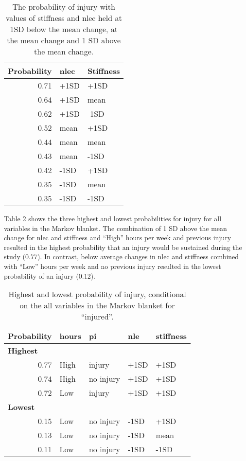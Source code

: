 \documentclass[
  english,
  man]{apa6}
\begin{document}
\begin{table}[H]

\caption{\label{tab:table11}The probability of injury with values of stiffness and nlec held at 1SD below the mean change, at the mean change and 1 SD above the mean change.}
\centering
\begin{tabular}[t]{r|l|l}
\hline
\textbf{Probability} & \textbf{nlec} & \textbf{Stiffness}\\
\hline
0.71 & +1SD & +1SD\\
\hline
0.64 & +1SD & mean\\
\hline
0.62 & +1SD & -1SD\\
\hline
0.52 & mean & +1SD\\
\hline
0.44 & mean & mean\\
\hline
0.43 & mean & -1SD\\
\hline
0.42 & -1SD & +1SD\\
\hline
0.35 & -1SD & mean\\
\hline
0.35 & -1SD & -1SD\\
\hline
\end{tabular}
\end{table}

Table \ref{tab:table12} shows the three highest and lowest probabilities for injury for all variables in the Markov blanket.
The combination of 1 SD above the mean change for nlec and stiffness and ``High'' hours per week and previous injury resulted in the highest probability that an injury would be sustained during the study (0.77).
In contrast, below average changes in nlec and stiffness combined with ``Low'' hours per week and no previous injury resulted in the lowest probability of an injury (0.12).

\begin{table}[H]

\caption{\label{tab:table12}Highest and lowest probability of injury, conditional on the all variables in the Markov blanket for ``injured''.}
\centering
\begin{tabular}[t]{r|l|l|l|l}
\hline
\textbf{Probability} & \textbf{hours} & \textbf{pi} & \textbf{nle} & \textbf{stiffness}\\
\hline
\multicolumn{5}{l}{\textbf{Highest}}\\
\hline
\hspace{1em}0.77 & High & injury & +1SD & +1SD\\
\hline
\hspace{1em}0.74 & High & no injury & +1SD & +1SD\\
\hline
\hspace{1em}0.72 & Low & injury & +1SD & +1SD\\
\hline
\multicolumn{5}{l}{\textbf{Lowest}}\\
\hline
\hspace{1em}0.15 & Low & no injury & -1SD & +1SD\\
\hline
\hspace{1em}0.13 & Low & no injury & -1SD & mean\\
\hline
\hspace{1em}0.11 & Low & no injury & -1SD & -1SD\\
\hline
\end{tabular}
\end{table}
\end{document}

